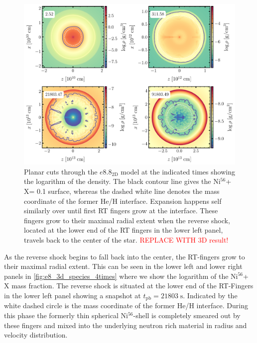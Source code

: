 \documentclass[fleqn,usenatbib]{mnras}
\newcommand{\nickel}{$\mathrm{Ni^{56}}$\xspace}
\newcommand{\tracer}{$\mathrm{X}$\xspace}
\begin{document}
\begin{figure}
 \centering
 \includegraphics[width=\textwidth]{pic/rho_cuts_e10_2d_4times.pdf} 
 \caption{Planar cuts through the $e8.8_{\mathrm{2D}}$ model at the indicated times showing the logarithm of the density. The black contour line gives the \nickel+\tracer = 0.1 surface, whereas the dashed white line denotes the mass coordinate of the former He/H interface. Expansion happens self similarly over until first RT fingers grow at the interface. These fingers grow to their maximal radial extent when the reverse shock, located at the lower end of the RT fingers in the lower left panel, travels back to the center of the star. \textcolor{red}{REPLACE WITH 3D result!}}
 \label{fig:e8_3d_species_4times}
\end{figure}

As the reverse shock begins to fall back into the center, the RT-fingers grow to their maximal radial extent. This can be seen in the lower left and lower right panels in \autoref{fig:e8_3d_species_4times} where we show the logarithm of the \nickel + \tracer mass fraction. The reverse shock is situated at the lower end of the RT-Fingers in the lower left panel showing a snapshot at $t_{\mathrm{pb}}=21803\;\mathrm{s}$. Indicated by the white dashed circle is the mass coordinate of the former He/H interface.
During this phase the formerly thin spherical \nickel-shell is completely smeared out by these fingers and mixed into the underlying neutron rich material in radius and velocity distribution. 
\end{document}
